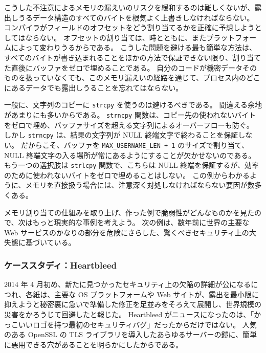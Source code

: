\documentclass[uplatex]{jsarticle}
\def\label#1{}%
\begin{document}
\begin{rem}[割り当てたバッファはゼロで埋める]\label{rem:ch9-zero-buffers}
こうした不注意によるメモリの漏えいのリスクを緩和するのは難しくないが、露出しうるデータ構造のすべてのバイトを根気よく上書きしなければならない。
コンパイラがフィールドのオフセットをどう割り当てるかを正確に予想しようとしてはならない。
オフセットの割り当ては、時とともに、またプラットフォームによって変わりうるからである。
こうした問題を避ける最も簡単な方法は、すべてのバイトが書き込まれることをほかの方法で保証できない限り、割り当てた直後にバッファをゼロで埋めることである。
自分のコードが機密データそのものを扱っていなくても、このメモリ漏えいの経路を通じて、プロセス内のどこにあるデータでも露出しうることを忘れてはならない。
\end{rem}

一般に、文字列のコピーに \texttt{strcpy} を使うのは避けるべきである。
間違える余地があまりにも多いからである。
\texttt{strncpy} 関数は、コピー先の使われないバイトをゼロで埋め、バッファサイズを超える文字列によるオーバーフローも防ぐ。
しかし \texttt{strncpy} は、結果の文字列が NULL 終端文字で終わることを保証しない。
だからこそ、バッファを \texttt{MAX\_USERNAME\_LEN + 1} のサイズで割り当て、NULL 終端文字の入る場所が常にあるようにすることが欠かせないのである。
もう一つの選択肢は \texttt{strlcpy} 関数で、こちらは NULL 終端を保証するが、効率のために使われないバイトをゼロで埋めることはしない。
この例からわかるように、メモリを直接扱う場合には、注意深く対処しなければならない要因が数多くある。

メモリ割り当ての仕組みを取り上げ、作った例で脆弱性がどんなものかを見たので、次はもっと現実的な事例を考えよう。
次の例は、数年前に世界の主要な Web サービスのかなりの部分を危険にさらした、驚くべきセキュリティ上の大失態に基づいている。

\subsubsection{ケーススタディ：Heartbleed}\label{subsec:ch9-heartbleed}

2014 年 4 月初め、新たに見つかったセキュリティ上の欠陥の詳細が公になるにつれ、各紙は、主要な OS プラットフォームや Web サイトが、露出を最小限に抑えようと秘密裏に急いで準備した修正を足並みをそろえて展開し、世界規模の災害をかろうじて回避したと報じた。
Heartbleed がニュースになったのは、「かっこいいロゴを持つ最初のセキュリティバグ」だったからだけではない。
人気のある OpenSSL の TLS ライブラリを導入したあらゆるサーバーの鎧に、簡単に悪用できる穴があることを明らかにしたからである。
\end{document}
